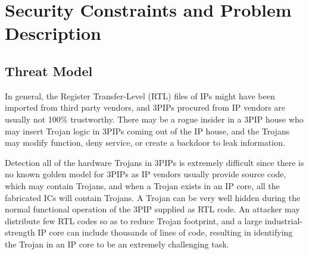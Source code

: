 \documentclass[conference]{IEEEtran}
\begin{document}

\section{Security Constraints and Problem Description}


\subsection{Threat Model}



In general, the Register Transfer-Level (RTL) files of IPs might have been imported from third party vendors, and 3PIPs procured from IP vendors are usually not 100\% trustworthy. There may be a rogue insider in a 3PIP house who may insert Trojan logic in 3PIPs coming out of the IP house, and the Trojans may modify function, deny service, or create a backdoor to leak information.%

Detection all of the hardware Trojans in 3PIPs is extremely difficult since there is no known golden model for 3PIPs as IP vendors usually provide source code, which may contain Trojans, and when a Trojan exists in an IP core, all the fabricated ICs will contain Trojans. A Trojan can be very well hidden during the normal functional operation of the 3PIP supplied as RTL code. An attacker may distribute few RTL codes so as to reduce Trojan footprint, and a large industrial-strength IP core can include thousands of lines of code, resulting in identifying the Trojan in an IP core to be an extremely challenging task.
\end{document}
